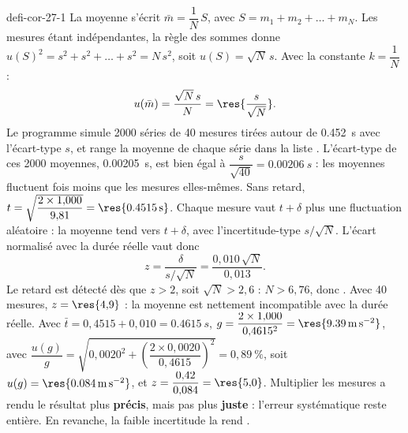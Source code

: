 \begin{blocEdition}{defi-cor-27-1}
La moyenne s'écrit $\bar m=\dfrac{1}{N}\,S$, avec $S=m_1+m_2+\dots+m_N$. Les mesures étant indépendantes, la règle des sommes
donne $u(S)^2=s^2+s^2+\dots+s^2=N\,s^2$, soit $u(S)=\sqrt N\,s$. Avec la constante $k=\dfrac1N$ :
\[u(\bar m)=\frac{\sqrt N\,s}{N}=\res{\frac{s}{\sqrt N}}.\]
Le programme simule \num{2000} séries de 40 mesures tirées autour de \qty{0,452}{s} avec l'écart-type $s$, et range la moyenne
de chaque série dans la liste . L'écart-type de ces \num{2000} moyennes, \qty{0,00205}{s}, est bien égal à
$\dfrac{s}{\sqrt{40}}=\qty{0,00206}{s}$ : les moyennes fluctuent  fois moins que les mesures elles-mêmes.
Sans retard, $t=\sqrt{\dfrac{2\times1{,}000}{9{,}81}}=\res{\qty{0,4515}{s}}$. Chaque mesure vaut $t+\delta$ plus une fluctuation aléatoire : la
moyenne tend vers $t+\delta$, avec l'incertitude-type $s/\sqrt N$. L'écart normalisé avec la durée réelle vaut donc
\[z=\frac{\delta}{s/\sqrt N}=\frac{0{,}010\,\sqrt N}{0{,}013}.\]
Le retard est détecté dès que $z>2$, soit $\sqrt N>2{,}6$ : $N>6{,}76$, donc . Avec 40 mesures,
$z=\res{4{,}9}$ : la moyenne est nettement incompatible avec la durée réelle.
Avec $\bar t=0{,}4515+0{,}010=\qty{0,4615}{s}$, $g=\dfrac{2\times1{,}000}{0{,}4615^2}=\res{\qty{9,39}{m.s^{-2}}}$, avec
$\dfrac{u(g)}{g}=\sqrt{0{,}0020^2+\left(\dfrac{2\times0{,}0020}{0{,}4615}\right)^2}=0{,}89~\%$, soit $u(g)=\res{\qty{0,084}{m.s^{-2}}}$, et $z=\dfrac{0{,}42}{0{,}084}=\res{5{,}0}$.
Multiplier les mesures a rendu le résultat plus \textbf{précis}, mais pas plus \textbf{juste} : l'erreur systématique
reste entière. En revanche, la faible incertitude la rend .
\end{blocEdition}

